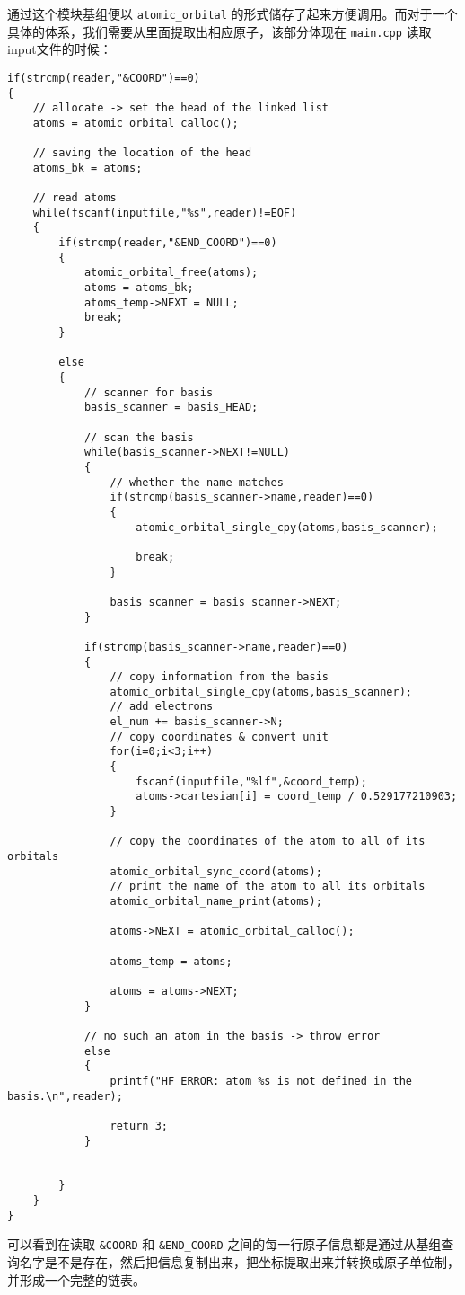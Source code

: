 \documentclass[12pt,a4paper,openany,twoside]{article}
\numberwithin{equation}{section}
\begin{document}
            通过这个模块基组便以 \lstinline$atomic_orbital$ 的形式储存了起来方便调用。而对于一个具体的体系，我们需要从里面提取出相应原子，该部分体现在 \lstinline$main.cpp$ 读取input文件的时候：
            \begin{lstlisting}
if(strcmp(reader,"&COORD")==0)
{
    // allocate -> set the head of the linked list
    atoms = atomic_orbital_calloc();

    // saving the location of the head
    atoms_bk = atoms;

    // read atoms
    while(fscanf(inputfile,"%s",reader)!=EOF)
    {
        if(strcmp(reader,"&END_COORD")==0)
        {
            atomic_orbital_free(atoms);
            atoms = atoms_bk;
            atoms_temp->NEXT = NULL;
            break;
        }

        else
        {
            // scanner for basis
            basis_scanner = basis_HEAD;

            // scan the basis
            while(basis_scanner->NEXT!=NULL)
            {
                // whether the name matches
                if(strcmp(basis_scanner->name,reader)==0)
                {
                    atomic_orbital_single_cpy(atoms,basis_scanner);

                    break;
                }

                basis_scanner = basis_scanner->NEXT;
            }

            if(strcmp(basis_scanner->name,reader)==0)
            {
                // copy information from the basis
                atomic_orbital_single_cpy(atoms,basis_scanner);
                // add electrons
                el_num += basis_scanner->N;
                // copy coordinates & convert unit
                for(i=0;i<3;i++)
                {
                    fscanf(inputfile,"%lf",&coord_temp);
                    atoms->cartesian[i] = coord_temp / 0.529177210903;
                }

                // copy the coordinates of the atom to all of its orbitals
                atomic_orbital_sync_coord(atoms);
                // print the name of the atom to all its orbitals
                atomic_orbital_name_print(atoms);

                atoms->NEXT = atomic_orbital_calloc();

                atoms_temp = atoms;

                atoms = atoms->NEXT;                        
            }

            // no such an atom in the basis -> throw error
            else
            {
                printf("HF_ERROR: atom %s is not defined in the basis.\n",reader);

                return 3;
            }
            

        }
    }
}
            \end{lstlisting}
            可以看到在读取 \lstinline$&COORD$ 和 \lstinline$&END_COORD$ 之间的每一行原子信息都是通过从基组查询名字是不是存在，然后把信息复制出来，把坐标提取出来并转换成原子单位制，并形成一个完整的链表。
\end{document}
